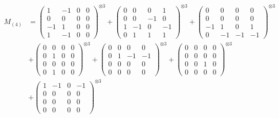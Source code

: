 \documentclass{article}
\newcommand{\Mthree}{%
    M_{(4)}
}
\begin{document}
        \newpage
        
        \footnotesize{
        \begin{align}
        \Mthree
        &= \label{Rs16-Rc11-Solution-12-c1} \begin{pmatrix} 1 & -1 & 0 & 0 \\ 0 & 0 & 0 & 0 \\ -1 & 1 & 0 & 0 \\ 1 & -1 & 0 & 0 \end{pmatrix}^{\otimes 3} 
            + \begin{pmatrix} 0 & 0 & 0 & 1 \\ 0 & 0 & -1 & 0 \\ 1 & -1 & 0 & -1 \\ 0 & 1 & 1 & 1 \end{pmatrix}^{\otimes 3} 
            + \begin{pmatrix} 0 & 0 & 0 & 0 \\ 0 & 0 & 0 & 0 \\ -1 & 1 & 0 & 1 \\ 0 & -1 & -1 & -1 \end{pmatrix}^{\otimes 3} \\
        &+ \label{Rs16-Rc11-Solution-12-c4} \begin{pmatrix} 0 & 0 & 0 & 0 \\ 0 & 1 & 0 & 0 \\ 0 & 0 & 0 & 0 \\ 0 & 1 & 0 & 0 \end{pmatrix}^{\otimes 3} 
            + \begin{pmatrix} 0 & 0 & 0 & 0 \\ 0 & 1 & -1 & -1 \\ 0 & 0 & 0 & 0 \\ 0 & 0 & 0 & 0 \end{pmatrix}^{\otimes 3} 
            + \begin{pmatrix} 0 & 0 & 0 & 0 \\ 0 & 0 & 0 & 0 \\ 0 & 0 & 1 & 0 \\ 0 & 0 & 0 & 0 \end{pmatrix}^{\otimes 3} \\
        &+ \label{Rs16-Rc11-Solution-12-c7} \begin{pmatrix} 1 & -1 & 0 & -1 \\ 0 & 0 & 0 & 0 \\ 0 & 0 & 0 & 0 \\ 0 & 0 & 0 & 0 \end{pmatrix}^{\otimes 3} 

\end{align}}
\end{document}

